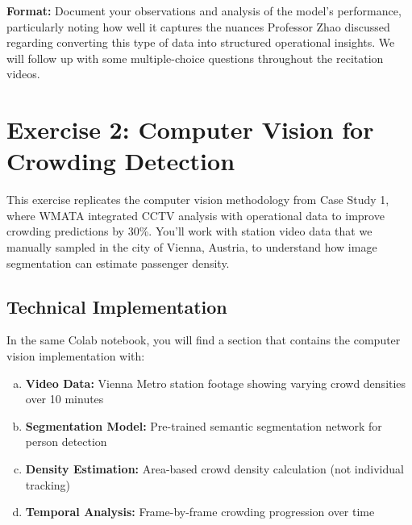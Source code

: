 \documentclass[11pt]{article}
\begin{document}
\noindent\textbf{Format:} Document your observations and analysis of the model's performance, particularly noting how well it captures the nuances Professor Zhao discussed regarding converting this type of data into structured operational insights. We will follow up with some multiple-choice questions throughout the recitation videos.


\section*{Exercise 2: Computer Vision for Crowding Detection}

\begin{center}
\end{center}

This exercise replicates the computer vision methodology from Case Study 1, where WMATA integrated CCTV analysis with operational data to improve crowding predictions by 30\%. You'll work with station video data that we manually sampled in the city of Vienna, Austria, to understand how image segmentation can estimate passenger density.

\subsection*{Technical Implementation}
In the same Colab notebook, you will find a section that contains the computer vision implementation with:
\begin{enumerate}[(a)]
\item \textbf{Video Data:} Vienna Metro station footage showing varying crowd densities over 10 minutes
\item \textbf{Segmentation Model:} Pre-trained semantic segmentation network for person detection
\item \textbf{Density Estimation:} Area-based crowd density calculation (not individual tracking)
\item \textbf{Temporal Analysis:} Frame-by-frame crowding progression over time
\end{enumerate}
\end{document}

